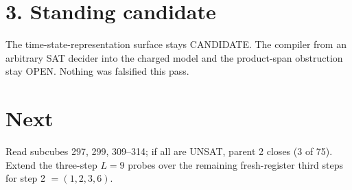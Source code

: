 \documentclass[11pt]{article}
\begin{document}
\section*{3. Standing candidate}
The time-state-representation surface stays CANDIDATE. The compiler from an arbitrary SAT decider into the charged model and the product-span obstruction stay OPEN. Nothing was falsified this pass.

\section*{Next}
Read subcubes 297, 299, 309--314; if all are UNSAT, parent 2 closes (3 of 75). Extend the three-step $L=9$ probes over the remaining fresh-register third steps for step 2 $=(1,2,3,6)$.
\end{document}
